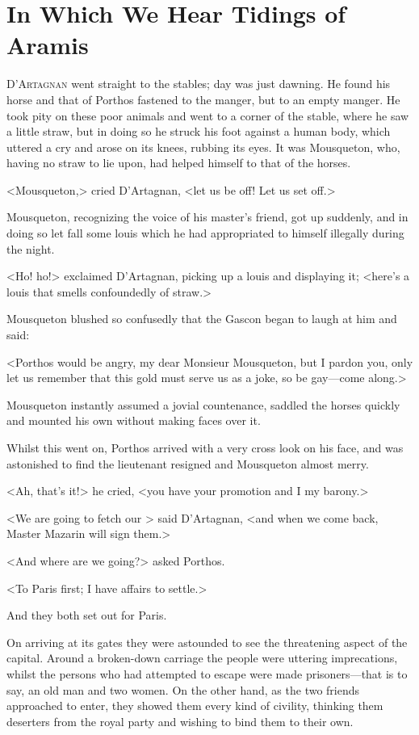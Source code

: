 \chapter{In Which We Hear Tidings of Aramis}

 \lettrine{D}{'Artagnan} went straight to the stables; day was just dawning. He found his horse and that of Porthos fastened to the manger, but to an empty manger. He took pity on these poor animals and went to a corner of the stable, where he saw a little straw, but in doing so he struck his foot against a human body, which uttered a cry and arose on its knees, rubbing its eyes. It was Mousqueton, who, having no straw to lie upon, had helped himself to that of the horses.

<Mousqueton,> cried D'Artagnan, <let us be off! Let us set off.>

Mousqueton, recognizing the voice of his master's friend, got up suddenly, and in doing so let fall some louis which he had appropriated to himself illegally during the night.

<Ho! ho!> exclaimed D'Artagnan, picking up a louis and displaying it; <here's a louis that smells confoundedly of straw.>

Mousqueton blushed so confusedly that the Gascon began to laugh at him and said:

<Porthos would be angry, my dear Monsieur Mousqueton, but I pardon you, only let us remember that this gold must serve us as a joke, so be gay—come along.>

Mousqueton instantly assumed a jovial countenance, saddled the horses quickly and mounted his own without making faces over it.

Whilst this went on, Porthos arrived with a very cross look on his face, and was astonished to find the lieutenant resigned and Mousqueton almost merry.

<Ah, that's it!> he cried, <you have your promotion and I my barony.>

<We are going to fetch our > said D'Artagnan, <and when we come back, Master Mazarin will sign them.>

<And where are we going?> asked Porthos.

<To Paris first; I have affairs to settle.>

And they both set out for Paris.

On arriving at its gates they were astounded to see the threatening aspect of the capital. Around a broken-down carriage the people were uttering imprecations, whilst the persons who had attempted to escape were made prisoners—that is to say, an old man and two women. On the other hand, as the two friends approached to enter, they showed them every kind of civility, thinking them deserters from the royal party and wishing to bind them to their own.

